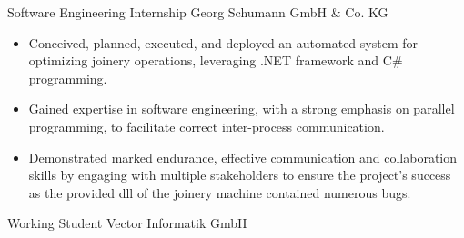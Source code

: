 \documentclass[11pt, letterpaper]{moderncv}
\newcommand{\de}[1]{}
\newcommand{\en}[1]{#1}
\newcommand{\de}[1]{#1}
\newcommand{\en}[1]{}
\begin{document}
        {\en{Software Engineering Internship}\de{Praktikum}}
        {Georg Schumann GmbH \& Co. KG}
        {}
        {}
        {\en{
        \begin{itemize}
            \item Conceived, planned, executed, and deployed an automated system for optimizing joinery operations, leveraging .NET framework and C\# programming.
            \item Gained expertise in software engineering, with a strong emphasis on parallel programming, to facilitate correct inter-process communication.
            \item Demonstrated marked endurance, effective communication and collaboration skills by engaging with multiple stakeholders to ensure the project's success as the provided dll of the joinery machine contained numerous bugs. 
        \end{itemize}}
        \de{
        \begin{itemize}
            \item Konzeption, Planung, Ausführung und Einsatz eines automatisierten Systems zur Optimierung von Abbundarbeiten unter Verwendung von .NET Framework und C\#-Programmierung
            \item Erlangung von Fachkenntnissen in der Softwareentwicklung mit Schwerpunkt auf paralleler Programmierung.
            \item Demonstration von Hartnäckigkeit, effektiver Kommunikations- und Kooperationsfähigkeiten durch die Zusammenarbeit mit verschiedenen Interessengruppen, um den Erfolg des Projekts zu gewährleisten.
        \end{itemize}}
        }
        {\en{Working Student}\de{Werkstudent}}
        {\en{Vector Informatik GmbH}\de{Vector Informatik GmbH}}
        {}
        {}
\end{document}
